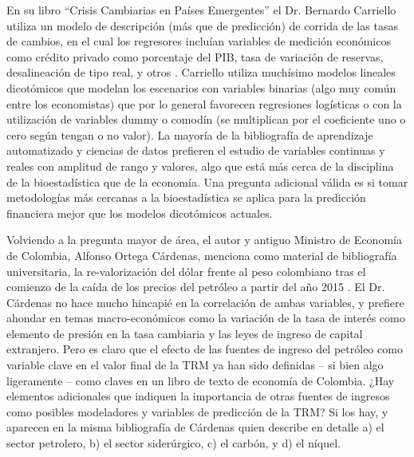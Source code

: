 En su libro “Crisis Cambiarias en Países Emergentes” el Dr. Bernardo Carriello utiliza un modelo de descripción (más que de predicción) de corrida de las tasas de cambios, en el cual los regresores incluían variables de medición económicos como crédito privado como porcentaje del PIB, tasa de variación de reservas, desalineación de tipo real, y otros \cite{crisisCambiarias}. Carriello utiliza muchísimo modelos lineales dicotómicos que modelan los escenarios con variables binarias (algo muy común entre los economistas) que por lo general favorecen regresiones logísticas o con la utilización de variables dummy o comodín (se multiplican por el coeficiente uno o cero según tengan o no valor). La mayoría de la bibliografía de aprendizaje automatizado y ciencias de datos prefieren el estudio de variables continuas y reales con amplitud de rango y valores, algo que está más cerca de la disciplina de la bioestadística que de la economía. Una pregunta adicional válida es si tomar metodologías más cercanas a la bioestadística se aplica para la predicción financiera mejor que los modelos dicotómicos actuales.
 
Volviendo a la pregunta mayor de área, el autor y antiguo Ministro de Economía de Colombia, Alfonso Ortega Cárdenas, menciona como material de bibliografía universitaria, la re-valorización del dólar frente al peso colombiano tras el comienzo de la caída de los precios del petróleo a partir del año 2015 \cite{cardenas}. El Dr. Cárdenas no hace mucho hincapié en la correlación de ambas variables, y prefiere ahondar en temas macro-económicos como la variación de la tasa de interés como elemento de presión en la tasa cambiaria y las leyes de ingreso de capital extranjero. Pero es claro que el efecto de las fuentes de ingreso del petróleo como variable clave en el valor final de la TRM ya han sido definidas – si bien algo ligeramente – como claves en un libro de texto de economía de Colombia. ¿Hay elementos adicionales que indiquen la importancia de otras fuentes de ingresos como posibles modeladores y variables de predicción de la TRM? Si los hay, y aparecen en la misma bibliografía de Cárdenas quien describe en detalle a) el sector petrolero, b) el sector siderúrgico, c) el carbón, y d) el níquel.

